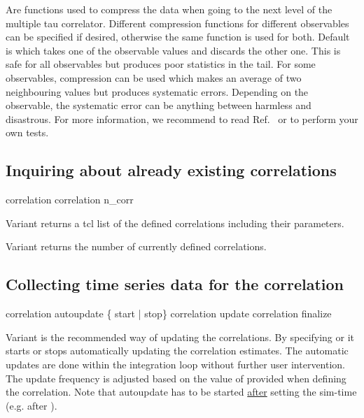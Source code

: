\begin{arguments}
  Are functions used to compress the data when going to the next level
  of the multiple tau correlator. Different compression functions for
  different observables can be specified if desired, otherwise the
  same function is used for both.  Default is  which
  takes one of the observable values and discards the other one. This
  is safe for all observables but produces poor statistics in the
  tail. For some observables,  compression can be used
  which makes an average of two neighbouring values but produces
  systematic errors.  Depending on the observable, the systematic
  error can be anything between harmless and disastrous. For more
  information, we recommend to read Ref.~\cite{ramirez10a} or to
  perform your own tests.
\end{arguments}

\subsection{Inquiring about already existing correlations}
\begin{essyntax}
 correlation 
 correlation n_corr
\end{essyntax}

Variant  returns a tcl list of the defined correlations
including their parameters.    

Variant  returns the number of currently
defined correlations.  
  
\subsection{Collecting time series data for the correlation}

\begin{essyntax}
 correlation  autoupdate \{ start | stop\} 
 correlation  update 
 correlation  finalize
\end{essyntax}

Variant  is the recommended way of updating the correlations.
By specifying  or  it starts or stops automatically
updating the correlation estimates. The automatic updates are done
within the integration loop without further user intervention.
The update frequency is adjusted based on the value of  
provided when defining the correlation. Note that autoupdate has to be 
started \underline{after} setting the sim-time (e.g. after ).

